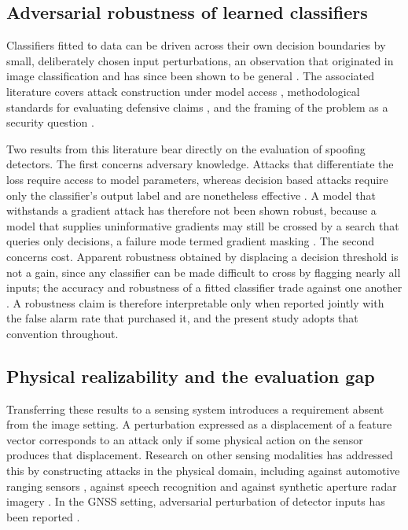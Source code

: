 \subsection{Adversarial robustness of learned classifiers}
\label{sec:rw_adversarial}

Classifiers fitted to data can be driven across their own decision boundaries by small,
deliberately chosen input perturbations, an observation that originated in image
classification and has since been shown to be general
\citep{szegedy2014intriguing,goodfellow2015explaining}. The associated literature covers
attack construction under model access \citep{madry2018towards}, methodological standards
for evaluating defensive claims \citep{carlini2019evaluating}, and the framing of the
problem as a security question \citep{biggio2018wild}.

Two results from this literature bear directly on the evaluation of spoofing detectors.
The first concerns adversary knowledge. Attacks that differentiate the loss require access
to model parameters, whereas decision based attacks require only the classifier's output
label and are nonetheless effective \citep{brendel2018decision,chen2020hopskipjump}. A
model that withstands a gradient attack has therefore not been shown robust, because a
model that supplies uninformative gradients may still be crossed by a search that queries
only decisions, a failure mode termed gradient masking \citep{athalye2018obfuscated}. The
second concerns cost. Apparent robustness obtained by displacing a decision threshold is
not a gain, since any classifier can be made difficult to cross by flagging nearly all
inputs; the accuracy and robustness of a fitted classifier trade against one another
\citep{tsipras2019robustness}. A robustness claim is therefore interpretable only when
reported jointly with the false alarm rate that purchased it, and the present study adopts
that convention throughout.

\subsection{Physical realizability and the evaluation gap}
\label{sec:rw_physical}

Transferring these results to a sensing system introduces a requirement absent from the
image setting. A perturbation expressed as a displacement of a feature vector corresponds
to an attack only if some physical action on the sensor produces that displacement.
Research on other sensing modalities has addressed this by constructing attacks in the
physical domain, including against automotive ranging sensors
\citep{petit2015remote,cao2021invisible}, against speech recognition
\citep{carlini2018audio} and against synthetic aperture radar imagery \citep{lin2023sar}.
In the GNSS setting, adversarial perturbation of detector inputs has been reported
\citep{an2025adversarial}.

